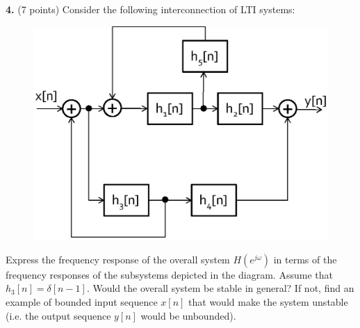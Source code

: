 \documentclass[a4paper,11pt,oneside]{article}
\begin{document}
\vspace{1cm}

\noindent \textbf{4.} (7 points) Consider the following interconnection of LTI systems:

\begin{figure}[h!]
\centering
\includegraphics[width=.8\textwidth]{fig2.eps}
\end{figure}

Express the frequency response of the overall system $H(e^{j\omega})$ in terms of the frequency responses of the subsystems depicted in the diagram. Assume that $h_3[n]=\delta[n-1]$. Would the overall system be stable in general? If not, find an example of bounded input sequence $x[n]$ that would make the system unstable (i.e. the output sequence $y[n]$ would be unbounded). 
\end{document}
